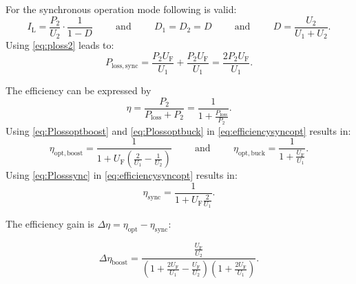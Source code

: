 \begin{solutionblock}
    For the synchronous operation mode following is valid:
    \begin{equation}
        I_\mathrm{L}=\frac{P_\mathrm{2}}{U_\mathrm{2}} \cdot \frac{1}{1-D}  
        \hspace{1cm} \mathrm{and} \hspace{1cm}
        D_1=D_2=D
        \hspace{1cm} \mathrm{and} \hspace{1cm}
        D=\frac{U_\mathrm{2}}{U_\mathrm{1}+U_\mathrm{2}}.
    \end{equation}
    Using \eqref{eq:ploss2} leads to:
    \begin{equation}
        P_\mathrm{loss,sync}=\frac{P_\mathrm{2} U_\mathrm{F}}{U_\mathrm{1}} + \frac{P_\mathrm{2} U_\mathrm{F}}{U_\mathrm{1}}=\frac{2 P_\mathrm{2} U_\mathrm{F}}{U_\mathrm{1}}.
        \label{eq:Plosssync}
    \end{equation}

    The efficiency can be expressed by 
    \begin{equation}
        \eta = \frac{P_\mathrm{2}}{P_\mathrm{loss}+P_\mathrm{2}}=\frac{1}{1+\frac{P_\mathrm{loss}}{P_\mathrm{2}}}.
        \label{eq:efficiencysyncopt}
    \end{equation}
    Using \eqref{eq:Plossoptboost} and \eqref{eq:Plossoptbuck} in \eqref{eq:efficiencysyncopt} results in:
    \begin{equation}
        \eta_\mathrm{opt,boost} = \frac{1}{1+U_\mathrm{F} \left(\frac{2}{U_\mathrm{1}}-\frac{1}{U_\mathrm{2}}\right)}
        \hspace{1cm} \mathrm{and} \hspace{1cm}        
        \eta_\mathrm{opt,buck} = \frac{1}{1+\frac{U_\mathrm{F}}{U_\mathrm{1}}}.
        \label{eq:efficiencyopt}
    \end{equation}
    Using \eqref{eq:Plosssync} in \eqref{eq:efficiencysyncopt} results in:
    \begin{equation}
        \eta_\mathrm{sync} = \frac{1}{1+U_\mathrm{F} \frac{2}{U_\mathrm{1}}}.
        \label{eq:efficiencysync}
    \end{equation}

    The efficiency gain is $\Delta \eta=\eta_\mathrm{opt}-\eta_\mathrm{sync}$:
    
    \begin{equation}
        \Delta \eta_\mathrm{boost}= \frac{\frac{U_\mathrm{F}}{U_\mathrm{2}}}{\left(1+ \frac{2 U_\mathrm{F}}{U_\mathrm{1}}-\frac{U_\mathrm{F}}{U_\mathrm{2}} \right) \left(1+\frac{2 U_\mathrm{F}}{U_\mathrm{1}}\right)}.
        \label{eq:efficiencygain}
    \end{equation}


\end{solutionblock}
